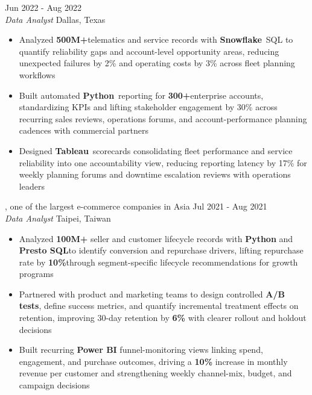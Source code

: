 \documentclass[11pt,letterpaper]{article}
\begin{document}
\vspace{0.375cm}
 \hfill Jun 2022 - Aug 2022\\[-1pt]
\textit{Data Analyst} \hfill Dallas, Texas
\begin{itemize}[leftmargin=1.45em, rightmargin=0pt, itemsep=-2pt, topsep=-1pt, parsep=0pt]
  \item \justifying Analyzed \textbf{500M+}\hspace{0.25em}telematics and service records with \textbf{Snowflake}\ SQL to quantify reliability gaps and account-level opportunity areas, reducing unexpected failures by 2\% and operating costs by 3\% across fleet planning workflows
  \item \justifying Built automated \textbf{Python}\ reporting for \textbf{300+}\hspace{0.25em}enterprise accounts, standardizing KPIs and lifting stakeholder engagement by 30\% across recurring sales reviews, operations forums, and account-performance planning cadences with commercial partners
  \item \justifying Designed \textbf{Tableau}\ scorecards consolidating fleet performance and service reliability into one accountability view, reducing reporting latency by 17\% for weekly planning forums and downtime escalation reviews with operations leaders
\end{itemize}

\vspace{0.375cm}
, one of the largest e-commerce companies in Asia \hfill Jul 2021 - Aug 2021\\[-1pt]
\textit{Data Analyst} \hfill Taipei, Taiwan
\begin{itemize}[leftmargin=1.45em, rightmargin=0pt, itemsep=-2pt, topsep=-1pt, parsep=0pt]
  \item \justifying Analyzed \textbf{100M+} seller and customer lifecycle records with \textbf{Python} and \textbf{Presto SQL}\hspace{0.25em}to identify conversion and repurchase drivers, lifting repurchase rate by \textbf{10\%}\hspace{0.25em}through segment-specific lifecycle recommendations for growth programs
  \item \justifying Partnered with product and marketing teams to design controlled \textbf{A/B tests}, define success metrics, and quantify incremental treatment effects on retention, improving 30-day retention by \textbf{6\%} with clearer rollout and holdout decisions
  \item \justifying Built recurring \textbf{Power BI} funnel-monitoring views linking spend, engagement, and purchase outcomes, driving a \textbf{10\%} increase in monthly revenue per customer and strengthening weekly channel-mix, budget, and campaign decisions
\end{itemize}
\end{document}
